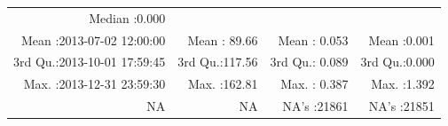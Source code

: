 \documentclass[
  10pt,
  a4paper,oneside]{article}
\begin{document}
\begin{longtable}[]{@{}rrrr@{}}
\begin{minipage}[t]{0.19\columnwidth}
Median :0.000\strut
\end{minipage}\tabularnewline
\begin{minipage}[t]{0.33\columnwidth}\raggedleft
Mean :2013-07-02 12:00:00\strut
\end{minipage} & \begin{minipage}[t]{0.19\columnwidth}\raggedleft
Mean : 89.66\strut
\end{minipage} & \begin{minipage}[t]{0.19\columnwidth}\raggedleft
Mean : 0.053\strut
\end{minipage} & \begin{minipage}[t]{0.19\columnwidth}\raggedleft
Mean :0.001\strut
\end{minipage}\tabularnewline
\begin{minipage}[t]{0.33\columnwidth}\raggedleft
3rd Qu.:2013-10-01 17:59:45\strut
\end{minipage} & \begin{minipage}[t]{0.19\columnwidth}\raggedleft
3rd Qu.:117.56\strut
\end{minipage} & \begin{minipage}[t]{0.19\columnwidth}\raggedleft
3rd Qu.: 0.089\strut
\end{minipage} & \begin{minipage}[t]{0.19\columnwidth}\raggedleft
3rd Qu.:0.000\strut
\end{minipage}\tabularnewline
\begin{minipage}[t]{0.33\columnwidth}\raggedleft
Max. :2013-12-31 23:59:30\strut
\end{minipage} & \begin{minipage}[t]{0.19\columnwidth}\raggedleft
Max. :162.81\strut
\end{minipage} & \begin{minipage}[t]{0.19\columnwidth}\raggedleft
Max. : 0.387\strut
\end{minipage} & \begin{minipage}[t]{0.19\columnwidth}\raggedleft
Max. :1.392\strut
\end{minipage}\tabularnewline
\begin{minipage}[t]{0.33\columnwidth}\raggedleft
NA\strut
\end{minipage} & \begin{minipage}[t]{0.19\columnwidth}\raggedleft
NA\strut
\end{minipage} & \begin{minipage}[t]{0.19\columnwidth}\raggedleft
NA's :21861\strut
\end{minipage} & \begin{minipage}[t]{0.19\columnwidth}\raggedleft
NA's :21851\strut
\end{minipage}\tabularnewline
\bottomrule
\end{longtable}
\end{document}
